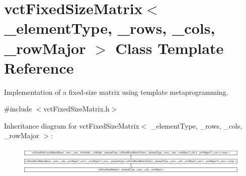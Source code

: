 \hypertarget{classvct_fixed_size_matrix}{\section{vct\-Fixed\-Size\-Matrix$<$ \-\_\-element\-Type, \-\_\-rows, \-\_\-cols, \-\_\-row\-Major $>$ Class Template Reference}
\label{classvct_fixed_size_matrix}
}


Implementation of a fixed-\/size matrix using template metaprogramming.  




{\ttfamily \#include $<$vct\-Fixed\-Size\-Matrix.\-h$>$}

Inheritance diagram for vct\-Fixed\-Size\-Matrix$<$ \-\_\-element\-Type, \-\_\-rows, \-\_\-cols, \-\_\-row\-Major $>$\-:\begin{figure}[H]
\begin{center}
\leavevmode
\includegraphics[height=1.420118cm]{d2/d1e/classvct_fixed_size_matrix}
\end{center}
\end{figure}
